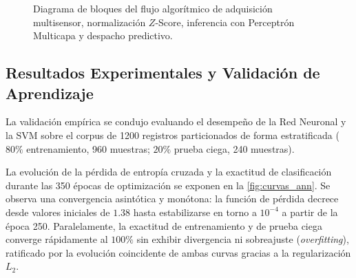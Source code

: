 \documentclass[conference]{IEEEtran}
\begin{document}
\begin{figure}[H]
\caption{Diagrama de bloques del flujo algor\'itmico de adquisici\'on multisensor, normalizaci\'on $Z$-Score, inferencia con Perceptr\'on Multicapa y despacho predictivo.}
\label{fig:flujo_algoritmo}
\end{figure}

\subsection{Resultados Experimentales y Validación de Aprendizaje}
La validación empírica se condujo evaluando el desempeño de la Red Neuronal y la SVM sobre el corpus de 1200 registros particionados de forma estratificada ($80\%$ entrenamiento, 960 muestras; $20\%$ prueba ciega, 240 muestras).

La evolución de la pérdida de entropía cruzada y la exactitud de clasificación durante las 350 épocas de optimización se exponen en la \autoref{fig:curvas_ann}. Se observa una convergencia asintótica y monótona: la función de pérdida decrece desde valores iniciales de $1.38$ hasta estabilizarse en torno a $10^{-4}$ a partir de la época 250. Paralelamente, la exactitud de entrenamiento y de prueba ciega converge rápidamente al $100\%$ sin exhibir divergencia ni sobreajuste (\textit{overfitting}), ratificado por la evolución coincidente de ambas curvas gracias a la regularización $L_2$.
\end{document}
